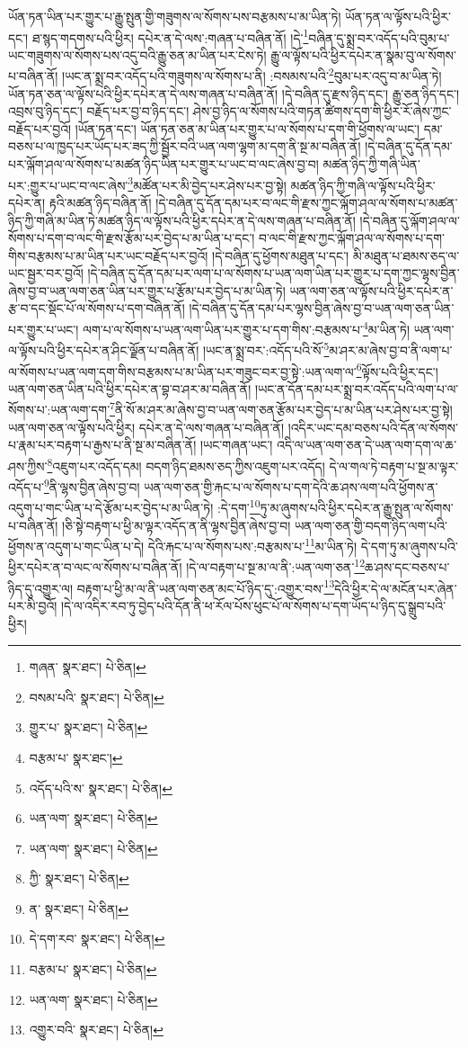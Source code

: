 ཡོན་ཏན་ཡིན་པར་གྱུར་པ་རྒྱུ་སྤུན་གྱི་གཟུགས་ལ་སོགས་པས་བརྩམས་པ་མ་ཡིན་ཏེ། ཡོན་ཏན་ལ་ལྟོས་པའི་ཕྱིར་དང་། ཐ་སྙད་གདགས་པའི་ཕྱིར། དཔེར་ན་དེ་ལས་:གཞན་པ་བཞིན་ནོ། །དེ་\footnote{གཞན་  སྣར་ཐང་།  པེ་ཅིན། }བཞིན་དུ་སྨྲ་བར་འདོད་པའི་བུམ་པ་ཡང་གཟུགས་ལ་སོགས་པས་འདུ་བའི་རྒྱུ་ཅན་མ་ཡིན་པར་ངེས་ཏེ། རྒྱུ་ལ་ལྟོས་པའི་ཕྱིར་དཔེར་ན་སྣམ་བུ་ལ་སོགས་པ་བཞིན་ནོ། །ཡང་ན་སྨྲ་བར་འདོད་པའི་གཟུགས་ལ་སོགས་པ་ནི། :བསམས་པའི་\footnote{བསམ་པའི་  སྣར་ཐང་།  པེ་ཅིན། }བུམ་པར་འདུ་བ་མ་ཡིན་ཏེ། ཡོན་ཏན་ཅན་ལ་ལྟོས་པའི་ཕྱིར་དཔེར་ན་དེ་ལས་གཞན་པ་བཞིན་ནོ། །དེ་བཞིན་དུ་རྫས་ཉིད་དང་། རྒྱུ་ཅན་ཉིད་དང་། འབྲས་བུ་ཉིད་དང་། བརྗོད་པར་བྱ་བ་ཉིད་དང་། ཤེས་བྱ་ཉིད་ལ་སོགས་པའི་གཏན་ཚིགས་དག་གི་ཕྱིར་རོ་ཞེས་ཀྱང་བརྗོད་པར་བྱའོ། །ཡོན་ཏན་དང་། ཡོན་ཏན་ཅན་མ་ཡིན་པར་གྱུར་པ་ལ་སོགས་པ་དག་གི་ཕྱོགས་ལ་ཡང་། དམ་བཅས་པ་ལ་ཁྱད་པར་ཡོད་པར་ཟད་ཀྱི་སྦྱོར་བའི་ཡན་ལག་ལྷག་མ་དག་ནི་སྔ་མ་བཞིན་ནོ། །དེ་བཞིན་དུ་དོན་དམ་པར་ལྐོག་ཤལ་ལ་སོགས་པ་མཚན་ཉིད་ཡིན་པར་གྱུར་པ་ཡང་བ་ལང་ཞེས་བྱ་བ། མཚན་ཉིད་ཀྱི་གཞི་ཡིན་པར་:གྱུར་པ་ཡང་བ་ལང་ཞེས་\footnote{གྱུར་པ་  སྣར་ཐང་།  པེ་ཅིན། }མཚོན་པར་མི་བྱེད་པར་ཤེས་པར་བྱ་སྟེ། མཚན་ཉིད་ཀྱི་གཞི་ལ་ལྟོས་པའི་ཕྱིར་དཔེར་ན། རྟའི་མཚན་ཉིད་བཞིན་ནོ། །དེ་བཞིན་དུ་དོན་དམ་པར་བ་ལང་གི་རྫས་ཀྱང་ལྐོག་ཤལ་ལ་སོགས་པ་མཚན་ཉིད་ཀྱི་གཞི་མ་ཡིན་ཏེ་མཚན་ཉིད་ལ་ལྟོས་པའི་ཕྱིར་དཔེར་ན་དེ་ལས་གཞན་པ་བཞིན་ནོ། །དེ་བཞིན་དུ་ལྐོག་ཤལ་ལ་སོགས་པ་དག་བ་ལང་གི་རྫས་རྩོམ་པར་བྱེད་པ་མ་ཡིན་པ་དང་། བ་ལང་གི་རྫས་ཀྱང་ལྐོག་ཤལ་ལ་སོགས་པ་དག་གིས་བརྩམས་པ་མ་ཡིན་པར་ཡང་བརྗོད་པར་བྱའོ། །དེ་བཞིན་དུ་ཕྱོགས་མཐུན་པ་དང་། མི་མཐུན་པ་ཐམས་ཅད་ལ་ཡང་སྦྱར་བར་བྱའོ། །དེ་བཞིན་དུ་དོན་དམ་པར་ལག་པ་ལ་སོགས་པ་ཡན་ལག་ཡིན་པར་གྱུར་པ་དག་ཀྱང་ལྷས་བྱིན་ཞེས་བྱ་བ་ཡན་ལག་ཅན་ཡིན་པར་གྱུར་པ་རྩོམ་པར་བྱེད་པ་མ་ཡིན་ཏེ། ཡན་ལག་ཅན་ལ་ལྟོས་པའི་ཕྱིར་དཔེར་ན་རྩ་བ་དང་སྡོང་པོ་ལ་སོགས་པ་དག་བཞིན་ནོ། །དེ་བཞིན་དུ་དོན་དམ་པར་ལྷས་བྱིན་ཞེས་བྱ་བ་ཡན་ལག་ཅན་ཡིན་པར་གྱུར་པ་ཡང་། ལག་པ་ལ་སོགས་པ་ཡན་ལག་ཡིན་པར་གྱུར་པ་དག་གིས་:བརྩམས་པ་\footnote{བརྩམ་པ་  སྣར་ཐང་། }མ་ཡིན་ཏེ། ཡན་ལག་ལ་ལྟོས་པའི་ཕྱིར་དཔེར་ན་ཤིང་ལྗོན་པ་བཞིན་ནོ། །ཡང་ན་སྨྲ་བར་:འདོད་པའི་སོ་\footnote{འདོད་པའི་ས་  སྣར་ཐང་།  པེ་ཅིན། }མ་ཤར་མ་ཞེས་བྱ་བ་ནི་ལག་པ་ལ་སོགས་པ་ཡན་ལག་དག་གིས་བརྩམས་པ་མ་ཡིན་པར་གཟུང་བར་བྱ་སྟེ་:ཡན་ལག་ལ་\footnote{ཡན་ལག་  སྣར་ཐང་།  པེ་ཅིན། }ལྟོས་པའི་ཕྱིར་དང་། ཡན་ལག་ཅན་ཡིན་པའི་ཕྱིར་དཔེར་ན་བྷ་བ་ཤར་མ་བཞིན་ནོ། །ཡང་ན་དོན་དམ་པར་སྨྲ་བར་འདོད་པའི་ལག་པ་ལ་སོགས་པ་:ཡན་ལག་དག་\footnote{ཡན་ལག་  སྣར་ཐང་།  པེ་ཅིན། }ནི་སོ་མ་ཤར་མ་ཞེས་བྱ་བ་ཡན་ལག་ཅན་རྩོམ་པར་བྱེད་པ་མ་ཡིན་པར་ཤེས་པར་བྱ་སྟེ། ཡན་ལག་ཅན་ལ་ལྟོས་པའི་ཕྱིར། དཔེར་ན་དེ་ལས་གཞན་པ་བཞིན་ནོ། །འདིར་ཡང་དམ་བཅས་པའི་དོན་ལ་སོགས་པ་རྣམ་པར་བརྟག་པ་རྒྱས་པ་ནི་སྔ་མ་བཞིན་ནོ། །ཡང་གཞན་ཡང་། འདི་ལ་ཡན་ལག་ཅན་དེ་ཡན་ལག་དག་ལ་ཆ་ཤས་ཀྱིས་\footnote{ཀྱི་  སྣར་ཐང་།  པེ་ཅིན། }འཇུག་པར་འདོད་དམ། བདག་ཉིད་ཐམས་ཅད་ཀྱིས་འཇུག་པར་འདོད། དེ་ལ་གལ་ཏེ་བརྟག་པ་སྔ་མ་ལྟར་འདོད་པ་\footnote{ན་  སྣར་ཐང་།  པེ་ཅིན། }ནི་ལྷས་བྱིན་ཞེས་བྱ་བ། ཡན་ལག་ཅན་གྱི་རྐང་པ་ལ་སོགས་པ་དག་དེའི་ཆ་ཤས་ལག་པའི་ཕྱོགས་ན་འདུག་པ་གང་ཡིན་པ་དེ་རྩོམ་པར་བྱེད་པ་མ་ཡིན་ཏེ། :དེ་དག་\footnote{དེ་དག་རབ་  སྣར་ཐང་།  པེ་ཅིན། }ཏུ་མ་ཞུགས་པའི་ཕྱིར་དཔེར་ན་རྒྱུ་སྤུན་ལ་སོགས་པ་བཞིན་ནོ། །ཅི་སྟེ་བརྟག་པ་ཕྱི་མ་ལྟར་འདོད་ན་ནི་ལྷས་བྱིན་ཞེས་བྱ་བ། ཡན་ལག་ཅན་གྱི་བདག་ཉིད་ལག་པའི་ཕྱོགས་ན་འདུག་པ་གང་ཡིན་པ་དེ། དེའི་རྐང་པ་ལ་སོགས་པས་:བརྩམས་པ་\footnote{བརྩམ་པ་  སྣར་ཐང་།  པེ་ཅིན། }མ་ཡིན་ཏེ། དེ་དག་ཏུ་མ་ཞུགས་པའི་ཕྱིར་དཔེར་ན་བ་ལང་ལ་སོགས་པ་བཞིན་ནོ། །དེ་ལ་བརྟག་པ་སྔ་མ་ལ་ནི་:ཡན་ལག་ཅན་\footnote{ཡན་ལག་  སྣར་ཐང་།  པེ་ཅིན། }ཆ་ཤས་དང་བཅས་པ་ཉིད་དུ་འགྱུར་ལ། བརྟག་པ་ཕྱི་མ་ལ་ནི་ཡན་ལག་ཅན་མང་པོ་ཉིད་དུ་:འགྱུར་བས་\footnote{འགྱུར་བའི་  སྣར་ཐང་།  པེ་ཅིན། }དེའི་ཕྱིར་དེ་ལ་མངོན་པར་ཞེན་པར་མི་བྱའོ། །དེ་ལ་འདིར་རབ་ཏུ་བྱེད་པའི་དོན་ནི་ཕ་རོལ་པོས་ཕུང་པོ་ལ་སོགས་པ་དག་ཡོད་པ་ཉིད་དུ་སྒྲུབ་པའི་ཕྱིར། 